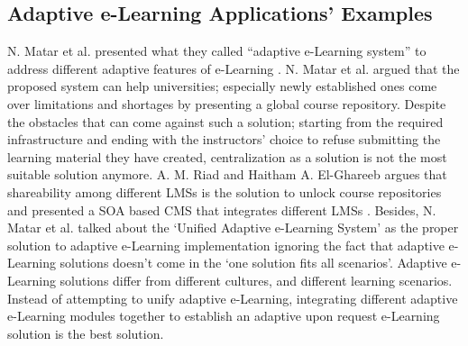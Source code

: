 \documentclass[12pt,a4paper,final,twoside,onecolumn,titlepage]{book}
\begin{document}
\subsection{Adaptive e-Learning Applications' Examples}
N. Matar et al. presented what they called “adaptive e-Learning system” to address different adaptive features of e-Learning \cite{R11}. N. Matar et al. argued that the proposed system can help universities; especially newly established ones come over limitations and shortages by presenting a global course repository. Despite the obstacles that can come against such a solution; starting from the required infrastructure and ending with the instructors’ choice to refuse submitting the learning material they have created, centralization as a solution is not the most suitable solution anymore. A. M. Riad and Haitham A. El-Ghareeb argues that shareability among different \gls{LMS}s is the solution to unlock course repositories and presented a \gls{SOA} based \gls{CMS} that integrates different \gls{LMS}s \cite{EV09}. Besides, N. Matar et al. talked about the ‘Unified Adaptive e-Learning System’ as the proper solution to adaptive e-Learning implementation ignoring the fact that adaptive e-Learning solutions doesn’t come in the ‘one solution fits all scenarios’. Adaptive e-Learning solutions differ from different cultures, and different learning scenarios. Instead of attempting to unify adaptive e-Learning, integrating different adaptive e-Learning modules together to establish an adaptive upon request e-Learning solution is the best solution.
\end{document}
